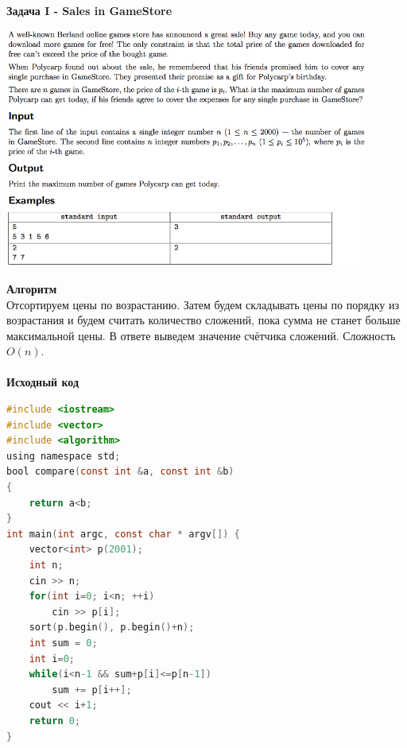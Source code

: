 \documentclass[a4paper,12pt]{article}
\begin{document}
\newpage
\textbf{{\large Задача I - Sales in GameStore}} \\
\begin{center}
\includegraphics[width=0.9\textwidth]{CT_ACM_WEST/CT_ACM_WEST_I.png}\\ [1cm]
\end{center}
\textbf{{\large Алгоритм}} \\
Отсортируем цены по возрастанию. Затем будем складывать цены по порядку из возрастания и будем считать количество сложений, пока сумма не станет больше максимальной цены. В ответе выведем значение счётчика сложений. Сложность $O(n)$.  \\ 
\\
\newpage
\textbf{{\large Исходный код}}
\begin{lstlisting}[language=C]
#include <iostream>
#include <vector>
#include <algorithm>
using namespace std;
bool compare(const int &a, const int &b)
{
    return a<b;
}
int main(int argc, const char * argv[]) {
    vector<int> p(2001);
    int n;
    cin >> n;
    for(int i=0; i<n; ++i)
        cin >> p[i];
    sort(p.begin(), p.begin()+n);
    int sum = 0;
    int i=0;
    while(i<n-1 && sum+p[i]<=p[n-1])
        sum += p[i++];
    cout << i+1;
    return 0;
}
\end{lstlisting}
\end{document}

